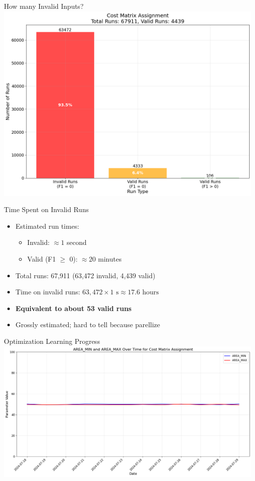 \begin{frame}{How many Invalid Inputs?}
    \centering
    \includegraphics[width=1\textwidth,height=0.85\textheight,keepaspectratio]{images/bom/152441d1-c714-4f49-aca6-3d0d750f50a4.png}
\end{frame}

\begin{frame}{Time Spent on Invalid Runs}
    \begin{itemize}
        \item Estimated run times:
              \begin{itemize}
                  \item Invalid: $\approx 1$ second
                  \item Valid (F1 $\geq$ 0): $\approx 20$ minutes
              \end{itemize}
        \item Total runs: 67,911 (63,472 invalid, 4,439 valid)
        \item Time on invalid runs: $63,472 \times 1\text{ s} \approx 17.6\text{ hours}$
        \item \textbf{Equivalent to about 53 valid runs}
        \item Grossly estimated; hard to tell because parellize
    \end{itemize}
\end{frame}

\begin{frame}{Optimization Learning Progress}
    \centering
    \includegraphics[width=\textwidth,height=0.85\textheight,keepaspectratio]{images/bom/16dae317-9da8-4032-bf1c-8ef11995233e.png}
\end{frame}

